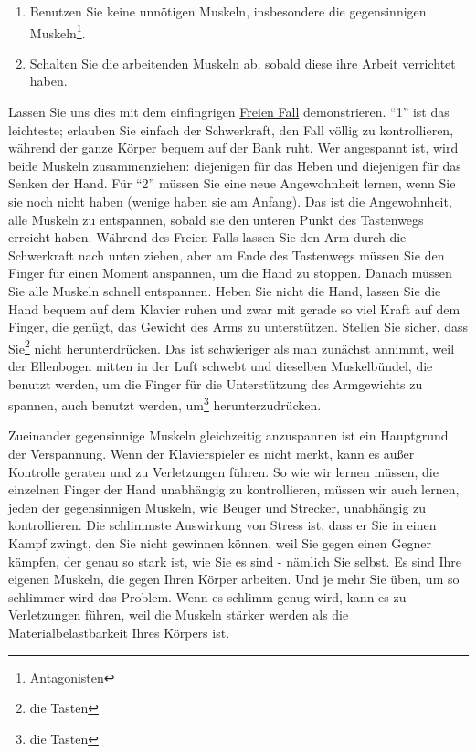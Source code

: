 \begin{enumerate}[label={\arabic*.}] 
\item Benutzen Sie keine unnötigen Muskeln, insbesondere die gegensinnigen Muskeln\footnote{Antagonisten}.
\item Schalten Sie die arbeitenden Muskeln ab, sobald diese ihre Arbeit verrichtet haben.
 \end{enumerate}
Lassen Sie uns dies mit dem einfingrigen \hyperref[c1ii10]{Freien Fall} demonstrieren.
\enquote{1} ist das leichteste; erlauben Sie einfach der Schwerkraft, den Fall völlig zu kontrollieren, während der ganze Körper bequem auf der Bank ruht.
Wer angespannt ist, wird beide Muskeln zusammenziehen: diejenigen für das Heben und diejenigen für das Senken der Hand.
Für \enquote{2} müssen Sie eine neue Angewohnheit lernen, wenn Sie sie noch nicht haben (wenige haben sie am Anfang).
Das ist die Angewohnheit, alle Muskeln zu entspannen, sobald sie den unteren Punkt des Tastenwegs erreicht haben.
Während des Freien Falls lassen Sie den Arm durch die Schwerkraft nach unten ziehen, aber am Ende des Tastenwegs müssen Sie den Finger für einen Moment anspannen, um die Hand zu stoppen.
Danach müssen Sie alle Muskeln schnell entspannen.
Heben Sie nicht die Hand, lassen Sie die Hand bequem auf dem Klavier ruhen und zwar mit gerade so viel Kraft auf dem Finger, die genügt, das Gewicht des Arms zu unterstützen.
Stellen Sie sicher, dass Sie\footnote{die Tasten} nicht herunterdrücken.
Das ist schwieriger als man zunächst annimmt, weil der Ellenbogen mitten in der Luft schwebt und dieselben Muskelbündel, die benutzt werden, um die Finger für die Unterstützung des Armgewichts zu spannen, auch benutzt werden, um\footnote{die Tasten} herunterzudrücken.

Zueinander gegensinnige Muskeln gleichzeitig anzuspannen ist ein Hauptgrund der Verspannung.
Wenn der Klavierspieler es nicht merkt, kann es außer Kontrolle geraten und zu Verletzungen führen.
So wie wir lernen müssen, die einzelnen Finger der Hand unabhängig zu kontrollieren, müssen wir auch lernen, jeden der gegensinnigen Muskeln, wie Beuger und Strecker, unabhängig zu kontrollieren.
Die schlimmste Auswirkung von Stress ist, dass er Sie in einen Kampf zwingt, den Sie nicht gewinnen können, weil Sie gegen einen Gegner kämpfen, der genau so stark ist, wie Sie es sind - nämlich Sie selbst.
Es sind Ihre eigenen Muskeln, die gegen Ihren Körper arbeiten. 
Und je mehr Sie üben, um so schlimmer wird das Problem.
Wenn es schlimm genug wird, kann es zu Verletzungen führen, weil die Muskeln stärker werden als die Materialbelastbarkeit Ihres Körpers ist.

